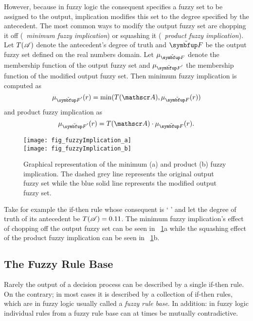 However, because in fuzzy logic the consequent specifies a fuzzy set to be assigned to the output, implication modifies this set to the degree specified by the antecedent. The most common ways to modify the output fuzzy set are chopping it off (\ie\ \emph{minimum fuzzy implication}) or squashing it (\ie\ \emph{product fuzzy implication}). Let $T(\mathscr{A})$ denote the antecedent's degree of truth and $\fset{F}$ be the output fuzzy set defined on the real numbers domain. Let $\mu_\fset{F}$ denote the membership function of the output fuzzy set and $\mu_{\fset{F}'}$ the membership function of the modified output fuzzy set. Then minimum fuzzy implication is computed as
%
\begin{equation}
  \mu_{\fset{F}'}(r)=\min(T(\statement{A}),\mu_\fset{F}(r))
\end{equation}
%
and product fuzzy implication as
%
\begin{equation}
  \mu_{\fset{F}'}(r)=T(\statement{A})\cdot\mu_\fset{F}(r).
\end{equation}

\begin{figure}
  \texttt{[image: fig\_fuzzyImplication\_a]}\\
  \vspace*{2mm}
  \texttt{[image: fig\_fuzzyImplication\_b]}
  \caption{Graphical representation of the minimum (a) and product (b) fuzzy implication. The dashed grey line represents the original output fuzzy set while the blue solid line represents the modified output fuzzy set.}
  \label{fig:implication}
\end{figure}

Take for example the if-then rule whose consequent is `  ' and let the degree of truth of its antecedent be $T(\mathscr{A})=0.11$. The minimum fuzzy implication's effect of chopping off the output fuzzy set can be seen in \fig~\ref{fig:implication}a while the squashing effect of the product fuzzy implication can be seen in \fig~\ref{fig:implication}b.

\subsection{The Fuzzy Rule Base}
\label{subsec:fuzzyModelling:fuzzyRuleBase}
Rarely the output of a decision process can be described by a single if-then rule. On the contrary; in most cases it is described by a collection of if-then rules, which are in fuzzy logic usually called a \emph{fuzzy rule base}. In addition: in fuzzy logic individual rules from a fuzzy rule base can at times be mutually contradictive.

